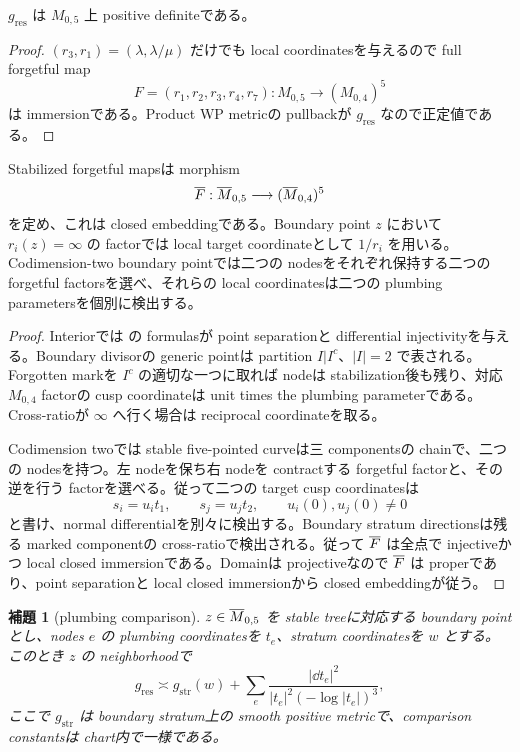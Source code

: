 \documentclass[11pt,a4paper]{ltjsarticle}
\theoremstyle{plain}
\newtheorem{lemma}[theorem]{補題}\newtheorem{corollary}[theorem]{系}
\theoremstyle{definition}
\theoremstyle{remark}
\begin{document}
\begin{proposition}[positivity]\label{prop:res-WP-positive}
$g_{\mathrm{res}}$ は $M_{0,5}$ 上 positive definiteである。
\end{proposition}

\begin{proof}
$(r_3,r_1)=(\lambda,\lambda/\mu)$ だけでも local coordinatesを与えるので full forgetful map
\[
 F=(r_1,r_2,r_3,r_4,r_7):M_{0,5}\longrightarrow(M_{0,4})^5
\]
は immersionである。Product WP metricの pullbackが $g_{\mathrm{res}}$ なので正定値である。
\end{proof}

\begin{proposition}\label{prop:forgetful-closed-embedding}
Stabilized forgetful mapsは morphism
\[
 \overline F:\overline M_{0,5}\longrightarrow(\overline M_{0,4})^5
\]
を定め、これは closed embeddingである。Boundary point $z$ において $r_i(z)=\infty$ の factorでは local target coordinateとして $1/r_i$ を用いる。Codimension-two boundary pointでは二つの nodesをそれぞれ保持する二つの forgetful factorsを選べ、それらの local coordinatesは二つの plumbing parametersを個別に検出する。
\end{proposition}

\begin{proof}
Interiorでは  の formulasが point separationと differential injectivityを与える。Boundary divisorの generic pointは partition $I|I^c$、$|I|=2$ で表される。Forgotten markを $I^c$ の適切な一つに取れば nodeは stabilization後も残り、対応 $M_{0,4}$ factorの cusp coordinateは unit times the plumbing parameterである。Cross-ratioが $\infty$ へ行く場合は reciprocal coordinateを取る。

Codimension twoでは stable five-pointed curveは三 componentsの chainで、二つの nodesを持つ。左 nodeを保ち右 nodeを contractする forgetful factorと、その逆を行う factorを選べる。従って二つの target cusp coordinatesは
\[
 s_i=u_i t_1,
 \qquad
 s_j=u_j t_2,
 \qquad
 u_i(0),u_j(0)\ne0
\]
と書け、normal differentialを別々に検出する。Boundary stratum directionsは残る marked componentの cross-ratioで検出される。従って $\overline F$ は全点で injectiveかつ local closed immersionである。Domainは projectiveなので $\overline F$ は properであり、point separationと local closed immersionから closed embeddingが従う。
\end{proof}

\begin{lemma}[plumbing comparison]\label{lem:res-WP-plumbing}
$z\in\overline M_{0,5}$ を stable treeに対応する boundary pointとし、nodes $e$ の plumbing coordinatesを $t_e$、stratum coordinatesを $w$ とする。このとき $z$ の neighborhoodで
\[
 g_{\mathrm{res}}
 \asymp
 g_{\mathrm{str}}(w)
 +\sum_e\frac{|\dd t_e|^2}{|t_e|^2(-\log|t_e|)^3},
\]
ここで $g_{\mathrm{str}}$ は boundary stratum上の smooth positive metricで、comparison constantsは chart内で一様である。
\end{lemma}
\end{document}
